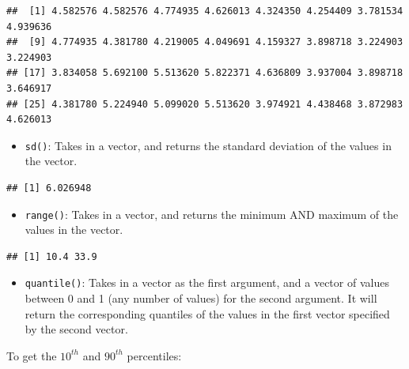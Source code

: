 \documentclass[
]{book}
\newenvironment{Shaded}{\begin{snugshade}}{\end{snugshade}}
\newcommand{\KeywordTok}[1]{\textcolor[rgb]{0.13,0.29,0.53}{\textbf{#1}}}
\newcommand{\NormalTok}[1]{#1}
\newcommand{\OperatorTok}[1]{\textcolor[rgb]{0.81,0.36,0.00}{\textbf{#1}}}
\providecommand{\tightlist}{%
  \setlength{\itemsep}{0pt}\setlength{\parskip}{0pt}}
\begin{document}
\begin{verbatim}
##  [1] 4.582576 4.582576 4.774935 4.626013 4.324350 4.254409 3.781534 4.939636
##  [9] 4.774935 4.381780 4.219005 4.049691 4.159327 3.898718 3.224903 3.224903
## [17] 3.834058 5.692100 5.513620 5.822371 4.636809 3.937004 3.898718 3.646917
## [25] 4.381780 5.224940 5.099020 5.513620 3.974921 4.438468 3.872983 4.626013
\end{verbatim}

\begin{itemize}
\tightlist
\item
  \texttt{sd()}: Takes in a vector, and returns the standard deviation of the values in the vector.
\end{itemize}

\begin{Shaded}
\end{Shaded}

\begin{verbatim}
## [1] 6.026948
\end{verbatim}

\begin{itemize}
\tightlist
\item
  \texttt{range()}: Takes in a vector, and returns the minimum AND maximum of the values in the vector.
\end{itemize}

\begin{Shaded}
\end{Shaded}

\begin{verbatim}
## [1] 10.4 33.9
\end{verbatim}

\begin{itemize}
\tightlist
\item
  \texttt{quantile()}: Takes in a vector as the first argument, and a vector of values between 0 and 1 (any number of values) for the second argument. It will return the corresponding quantiles of the values in the first vector specified by the second vector.
\end{itemize}

To get the \(10^{th}\) and \(90^{th}\) percentiles:
\end{document}
